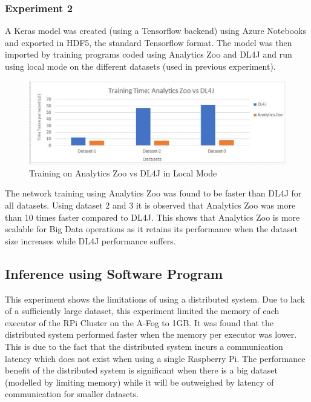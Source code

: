\subsubsection{Experiment 2 }
    
    
    
    A Keras model was created (using a Tensorflow backend) using Azure Notebooks  and exported in HDF5, the standard Tensorflow format. The model was then imported by training programs coded using Analytics Zoo and DL4J and run using local mode on the different datasets (used in previous experiment).
    
    \begin{figure}[H]
          
          \includegraphics[scale=0.8]{images/Exp2.JPG}
          \caption{Training on Analytics Zoo vs DL4J in Local Mode }
          \label{fig:Exp2}
              
    \end{figure}
    
    The network training using Analytics Zoo was found to be faster than DL4J for all datasets. Using dataset 2 and 3 it is observed that Analytics Zoo was more than 10 times faster compared to DL4J. This shows that Analytics Zoo is more scalable for Big Data operations as it retains its performance when the dataset size increases while DL4J performance suffers. 
    
\subsection{Inference using Software Program}

    This experiment shows the limitations of using a distributed system. Due to lack of a sufficiently large dataset, this experiment limited the memory of each executor of the RPi Cluster on the A-Fog to 1GB. It was found that the distributed system performed faster when the memory per executor was lower. This is due to the fact that the distributed system incurs a communication latency which does not exist when using a single Raspberry Pi. The performance benefit of the distributed system is significant when there is a big dataset (modelled by limiting memory) while it will be outweighed by latency of communication for smaller datasets.
    
